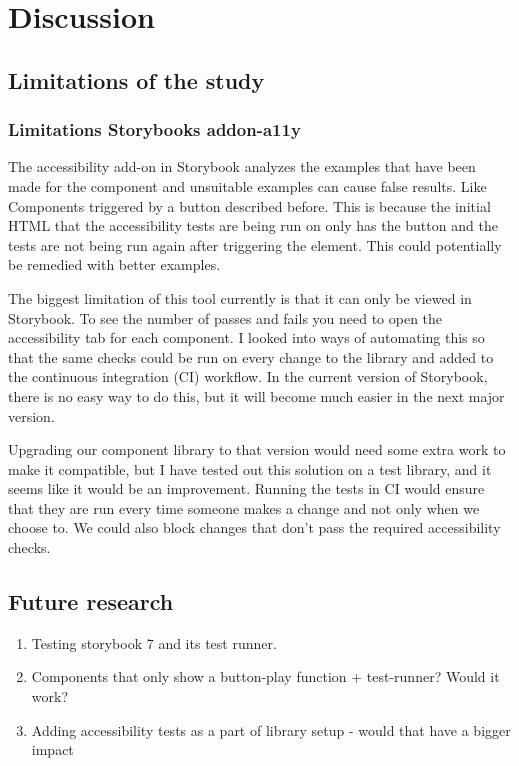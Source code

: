 \documentclass{master_thesis}
\begin{document}
\section{Discussion}

\subsection{Limitations of the study}
\subsubsection{Limitations Storybooks addon-a11y}

The accessibility add-on in Storybook analyzes the examples that have been made for the component and unsuitable examples can cause false results. Like Components triggered by a button described before. This is because the initial HTML that the accessibility tests are being run on only has the button and the tests are not being run again after triggering the element. This could potentially be remedied with better examples.

The biggest limitation of this tool currently is that it can only be viewed in Storybook. To see the number of passes and fails you need to open the accessibility tab for each component. I looked into ways of automating this so that the same checks could be run on every change to the library and added to the continuous integration (CI) workflow. In the current version of Storybook, there is no easy way to do this, but it will become much easier in the next major version.

Upgrading our component library to that version would need some extra work to make it compatible, but I have tested out this solution on a test library, and it seems like it would be an improvement. Running the tests in CI would ensure that they are run every time someone makes a change and not only when we choose to. We could also block changes that don't pass the required accessibility checks.


\subsection{Future research}

\begin{enumerate}
	\item Testing storybook 7 and its test runner.
	\item Components that only show a button-play function + test-runner? Would it work?
	\item Adding accessibility tests as a part of library setup - would that have a bigger impact
\end{enumerate}

\end{document}
